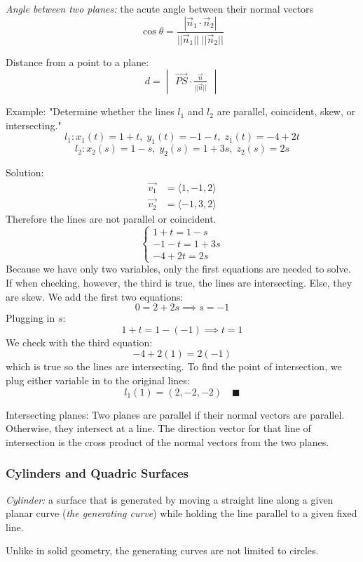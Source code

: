 \documentclass[12pt]{article}
\begin{document}
\emph{Angle between two planes:} the acute angle between their normal vectors
$$\cos \theta = \frac{|\vec{n}_1 \cdot \vec{n}_2|}{||\vec{n}_1|| \; ||\vec{n}_2||}$$

Distance from a point to a plane:
$$d = \begin{vmatrix}
    \vec{PS} \cdot \frac{\vec{n}}{||\vec{n}||}
\end{vmatrix}$$

Example: 
"Determine whether the lines $l_1$ and $l_2$ are parallel, coincident, skew, or intersecting."
$$l_1: x_1(t) = 1 + t, \; y_1(t) = -1 - t, \; z_1(t) = -4 +2t$$
$$l_2: x_2(s) = 1 - s, \; y_2(s) = 1 + 3s, \; z_2(s) = 2s$$

Solution:
\begin{align*}
    \vec{v_1} &= \langle 1, -1, 2\rangle\\
    \vec{v_2} &= \langle -1, 3, 2\rangle
\end{align*}
Therefore the lines are not parallel or coincident. 
$$\begin{cases}
    1 + t = 1 - s\\
    -1 - t = 1 +3s\\
    -4 + 2t = 2s
\end{cases}$$
Because we have only two variables, only the first equations are needed to solve. If when checking, however, the third is true, the lines are intersecting. Else, they are skew. 
We add the first two equations:
$$0 = 2 + 2s \implies s = -1$$
Plugging in $s$:
$$1 + t = 1 - (-1) \implies t = 1$$
We check with the third equation:
$$-4 + 2(1) = 2(-1)$$ which is true so the lines are intersecting. 
To find the point of intersection, we plug either variable in to the original lines:
$$l_1(1) = (2, -2, -2) \quad \blacksquare$$

Intersecting planes:
Two planes are parallel if their normal vectors are parallel. Otherwise, they intersect at a line. The direction vector for that line of intersection is the cross product of the normal vectors from the two planes. 

\subsubsection{Cylinders and Quadric Surfaces}
\emph{Cylinder:} a surface that is generated by moving a straight line along a given planar curve (\emph{the generating curve}) while holding the line parallel to a given fixed line. 

Unlike in solid geometry, the generating curves are not limited to circles.
\end{document}
